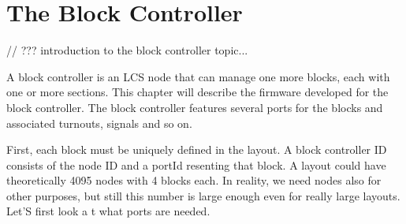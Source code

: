 \chapter{The Block Controller}

// ??? introduction to the block controller topic...

A block controller is an LCS node that can manage one more blocks, each with one or more sections. This chapter will describe the firmware developed for the block controller. The block controller features several ports for the blocks and associated turnouts, signals and so on.

First, each block must be uniquely defined in the layout. A block controller ID consists of the node ID and a portId resenting that block. A layout could have theoretically 4095 nodes with 4 blocks each. In reality, we need nodes also for other purposes, but still this number is large enough even for really large layouts. Let'S first look a t what ports are needed.
